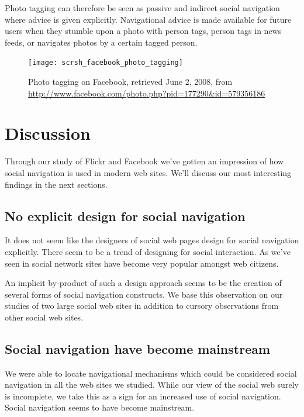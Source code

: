 Photo tagging can therefore be seen as passive and indirect social navigation
where advice is given explicitly.
Navigational advice is made available for future users when they stumble upon
a photo with person tags, person tags in news feeds, or navigates photos by a
certain tagged person.

\begin{figure}
  \texttt{[image: scrsh\_facebook\_photo\_tagging]}
  \caption[Facebook Photo Tagging]{%
     Photo tagging on Facebook,
     retrieved June 2, 2008, from
     \url{http://www.facebook.com/photo.php?pid=177290&id=579356186}}
  \label{figure:scrsh.facebook.photo.tagging}
\end{figure}

\section{Discussion}

Through our study of Flickr and Facebook we've gotten an impression of how
social navigation is used in modern web sites. We'll discuss our most
interesting findings in the next sections.

\subsection{No explicit design for social navigation}

It does not seem like the designers of social web pages design for social
navigation explicitly. There seem to be a trend of designing for social
interaction.
As we've seen in
social network sites have become very popular amongst web citizens.

An implicit by-product of such a design approach seems to be
the creation of several forms of social navigation constructs.
We base this observation on our studies of two large social web sites
in addition to cursory observations from other social web sites.

\subsection{Social navigation have become mainstream}

We were able to locate navigational mechanisms which could be considered
social navigation in all the web sites we studied. While our view of the
social web surely is incomplete, we take this as a sign for an increased use
of social navigation. Social navigation seems to have become mainstream.

